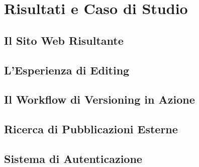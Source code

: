 \chapter{Risultati e Caso di Studio}
\label{chap:risultati}


\section{Il Sito Web Risultante}

\section{L'Esperienza di Editing}

\section{Il Workflow di Versioning in Azione}

\section{Ricerca di Pubblicazioni Esterne}

\section{Sistema di Autenticazione}

